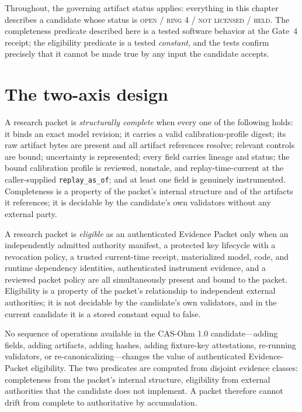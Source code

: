 Throughout, the governing artifact status applies: everything in this chapter describes a candidate whose status is \textsc{open / ring 4 / not licensed / held}. The completeness predicate described here is a tested software behavior at the Gate~4 receipt; the eligibility predicate is a tested \emph{constant}, and the tests confirm precisely that it cannot be made true by any input the candidate accepts.

\section{The two-axis design}\label{elig:sec:twoaxis}

\begin{definition}\label{elig:def:completeness}
A research packet is \emph{structurally complete} when every one of the following holds: it binds an exact model revision; it carries a valid calibration-profile digest; its raw artifact bytes are present and all artifact references resolve; relevant controls are bound; uncertainty is represented; every field carries lineage and status; the bound calibration profile is reviewed, nonstale, and replay-time-current at the caller-supplied \texttt{replay\_as\_of}; and at least one field is genuinely instrumented. Completeness is a property of the packet's internal structure and of the artifacts it references; it is decidable by the candidate's own validators without any external party.
\end{definition}

\begin{definition}\label{elig:def:eligibility}
A research packet is \emph{eligible} as an authenticated Evidence Packet only when an independently admitted authority manifest, a protected key lifecycle with a revocation policy, a trusted current-time receipt, materialized model, code, and runtime dependency identities, authenticated instrument evidence, and a reviewed packet policy are all simultaneously present and bound to the packet. Eligibility is a property of the packet's relationship to independent external authorities; it is not decidable by the candidate's own validators, and in the current candidate it is a stored constant equal to false.
\end{definition}

\begin{invariant}\label{elig:inv:nodrift}
No sequence of operations available in the CAS-Ohm 1.0 candidate---adding fields, adding artifacts, adding hashes, adding fixture-key attestations, re-running validators, or re-canonicalizing---changes the value of authenticated Evidence-Packet eligibility. The two predicates are computed from disjoint evidence classes: completeness from the packet's internal structure, eligibility from external authorities that the candidate does not implement. A packet therefore cannot drift from complete to authoritative by accumulation.
\end{invariant}

